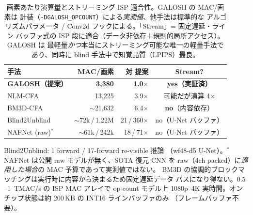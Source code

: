 \begin{table}[t]
\centering
\caption{画素あたり演算量とストリーミング ISP 適合性。GALOSH の MAC/画素は
計装（\texttt{-DGALOSH\_OPCOUNT}）による\emph{実測値}、他手法は標準的な
アルゴリズムパラメータ / Conv2d フックによる。「Stream」= 固定遅延・ライン
バッファ式の ISP 段に適合（データ非依存＋規則的局所アクセス）。GALOSH は
最軽量\emph{かつ}本当にストリーミング可能な唯一の軽量手法であり、同時に
blind 手法中で知覚品質（LPIPS）最良。}
\label{tab:isp}
\setlength{\tabcolsep}{4pt}
\begin{tabular}{l r r c}
\toprule
手法 & MAC/画素 & 対 提案 & Stream? \\
\midrule
\textbf{GALOSH（提案）} & \textbf{3{,}380} & \textbf{1.0$\times$} & \textbf{yes（実証済）} \\
NLM-CFA            & 13{,}225 & 3.9$\times$ & 可能だが演算 4$\times$ \\
BM3D-CFA           & $\sim$21{,}632 & 6.4$\times$ & \textbf{no}（内容依存） \\
Blind2Unblind      & $\sim$72k\,/\,1.22M & 21\,/\,360$\times$ & no（U-Net バッファ） \\
NAFNet (raw)$^{*}$ & $\sim$61k\,/\,242k & 18\,/\,71$\times$ & no（U-Net バッファ） \\
\bottomrule
\end{tabular}

\vspace{2pt}
{\footnotesize Blind2Unblind: 1 forward / 17-forward re-visible 推論
（wf48-d5 U-Net）。$^{*}$NAFNet は公開 raw モデルが無く、SOTA 復元 CNN を
raw（4ch packed）に\emph{適用した場合}の MAC 予算であって実測値ではない。
BM3D の協調的ブロックマッチングは実行時に内容から決まるため固定遅延データ
パスになり得ない。$0.5$--$1$~TMAC/s の ISP MAC アレイで op-count モデル上
1080p--4K 実時間。オンチップ状態は約 200\,KB の INT16 ラインバッファのみ
（フレームバッファ不要）。}
\end{table}
